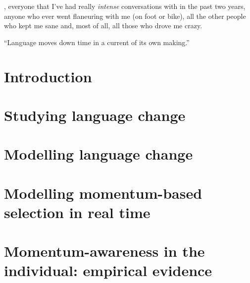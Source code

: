 \documentclass[oneside]{book}
\begin{document}
, everyone that I've had really \emph{intense} conversations with in the past two years, anyone who ever went flaneuring with me (on foot or bike), all the other people who kept me sane and, most of all, all those who drove me crazy.

\tableofcontents

\listoffigures
\listoftables

\newpage
\thispagestyle{empty}
\epigraph{``Language moves down time in a current of its own making.''}{\citep[p.160]{Sapir1921}}

\mainmatter

\chapter{Introduction}
\label{ch:intro}


\chapter{Studying language change}
\label{ch:review}


\chapter{Modelling language change}
\label{ch:modelling}


\chapter[Modelling momentum-based selection]{Modelling momentum-based selection in real time}
\label{ch:momentummodel}


\chapter[Momentum-awareness in the individual]{Momentum-awareness in the individual: empirical evidence}
\label{ch:questionnaire}

\end{document}
